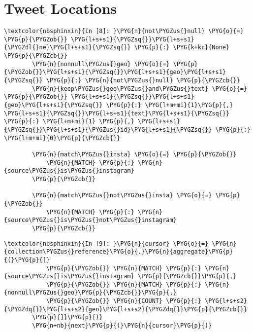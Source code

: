 \documentclass[letterpaper,10pt,english]{sphinxmanual}
\begin{document}
\section{Tweet Locations}
\label{\detokenize{04-mongo/04-05-device-and-geo:Tweet-Locations}}\label{\detokenize{04-mongo/04-05-device-and-geo::doc}}
%
\begin{Verbatim}[commandchars=\\\{\}]
\textcolor{nbsphinxin}{In [8]: }\PYG{n}{not\PYGZus{}null} \PYG{o}{=} \PYG{p}{\PYGZob{}} \PYG{l+s+s1}{\PYGZsq{}}\PYG{l+s+s1}{\PYGZdl{}ne}\PYG{l+s+s1}{\PYGZsq{}} \PYG{p}{:} \PYG{k+kc}{None} \PYG{p}{\PYGZcb{}}
        \PYG{n}{nonnull\PYGZus{}geo} \PYG{o}{=} \PYG{p}{\PYGZob{}}\PYG{l+s+s1}{\PYGZsq{}}\PYG{l+s+s1}{geo}\PYG{l+s+s1}{\PYGZsq{}} \PYG{p}{:} \PYG{n}{not\PYGZus{}null} \PYG{p}{\PYGZcb{}}
        \PYG{n}{keep\PYGZus{}geo\PYGZus{}and\PYGZus{}text} \PYG{o}{=} \PYG{p}{\PYGZob{}} \PYG{l+s+s1}{\PYGZsq{}}\PYG{l+s+s1}{geo}\PYG{l+s+s1}{\PYGZsq{}} \PYG{p}{:} \PYG{l+m+mi}{1}\PYG{p}{,} \PYG{l+s+s1}{\PYGZsq{}}\PYG{l+s+s1}{text}\PYG{l+s+s1}{\PYGZsq{}} \PYG{p}{:} \PYG{l+m+mi}{1} \PYG{p}{,} \PYG{l+s+s1}{\PYGZsq{}}\PYG{l+s+s1}{\PYGZus{}id}\PYG{l+s+s1}{\PYGZsq{}} \PYG{p}{:} \PYG{l+m+mi}{0}\PYG{p}{\PYGZcb{}}
        
        \PYG{n}{match\PYGZus{}insta} \PYG{o}{=} \PYG{p}{\PYGZob{}}
            \PYG{n}{MATCH} \PYG{p}{:} \PYG{n}{source\PYGZus{}is\PYGZus{}instagram}
        \PYG{p}{\PYGZcb{}}
        
        \PYG{n}{match\PYGZus{}not\PYGZus{}insta} \PYG{o}{=} \PYG{p}{\PYGZob{}}
            \PYG{n}{MATCH} \PYG{p}{:} \PYG{n}{source\PYGZus{}is\PYGZus{}not\PYGZus{}instagram}
        \PYG{p}{\PYGZcb{}}
\end{Verbatim}

%
\begin{Verbatim}[commandchars=\\\{\}]
\textcolor{nbsphinxin}{In [9]: }\PYG{n}{cursor} \PYG{o}{=} \PYG{n}{collection\PYGZus{}reference}\PYG{o}{.}\PYG{n}{aggregate}\PYG{p}{(}\PYG{p}{[}
            \PYG{p}{\PYGZob{}} \PYG{n}{MATCH} \PYG{p}{:} \PYG{n}{source\PYGZus{}is\PYGZus{}instagram} \PYG{p}{\PYGZcb{}}\PYG{p}{,}
            \PYG{p}{\PYGZob{}} \PYG{n}{MATCH} \PYG{p}{:} \PYG{n}{nonnull\PYGZus{}geo}\PYG{p}{\PYGZcb{}}\PYG{p}{,}
            \PYG{p}{\PYGZob{}} \PYG{n}{COUNT} \PYG{p}{:} \PYG{l+s+s2}{\PYGZdq{}}\PYG{l+s+s2}{geo}\PYG{l+s+s2}{\PYGZdq{}}\PYG{p}{\PYGZcb{}}
        \PYG{p}{]}\PYG{p}{)}
        \PYG{n+nb}{next}\PYG{p}{(}\PYG{n}{cursor}\PYG{p}{)}
\end{Verbatim}
\end{document}
